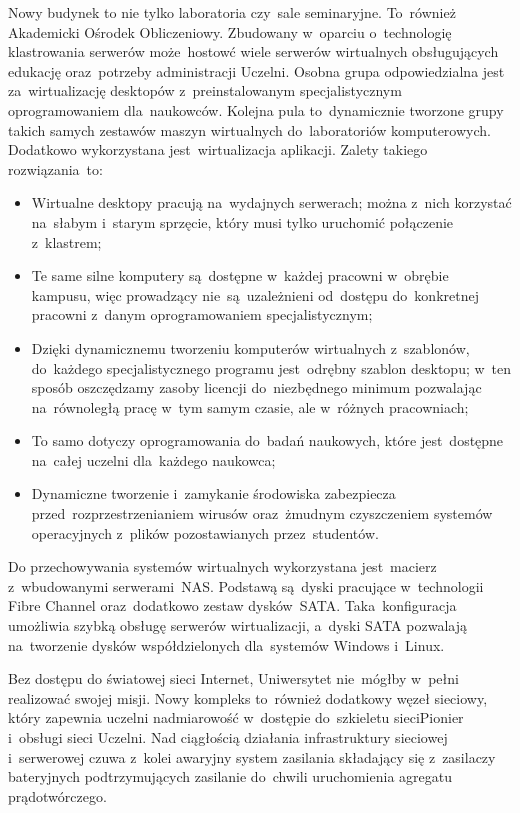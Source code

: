 ﻿\documentclass[a4paper,12pt]{article}
\begin{document}
Nowy budynek to nie tylko laboratoria czy~sale seminaryjne. To~również Akademicki Ośrodek Obliczeniowy. Zbudowany w~oparciu o~technologię klastrowania serwerów może~hostowć wiele serwerów wirtualnych obsługujących edukację oraz~potrzeby administracji Uczelni. Osobna grupa odpowiedzialna jest za~wirtualizację desktopów z~preinstalowanym specjalistycznym oprogramowaniem dla~naukowców. Kolejna pula
to~dynamicznie tworzone grupy takich samych zestawów maszyn wirtualnych do~laboratoriów komputerowych. Dodatkowo wykorzystana jest~wirtualizacja aplikacji. Zalety takiego rozwiązania~to:
\begin{itemize}
	\item Wirtualne desktopy pracują na~wydajnych serwerach; można z~nich korzystać na~słabym i~starym sprzęcie, który musi tylko uruchomić połączenie z~klastrem;
	\item Te same silne komputery są~dostępne w~każdej pracowni w~obrębie kampusu, więc prowadzący nie~są~uzależnieni od~dostępu do~konkretnej pracowni z~danym oprogramowaniem specjalistycznym;
	\item Dzięki dynamicznemu tworzeniu komputerów wirtualnych z~szablonów, do~każdego specjalistycznego programu jest~odrębny szablon desktopu; w~ten sposób oszczędzamy zasoby licencji do~niezbędnego minimum pozwalając na~równoległą pracę w~tym samym czasie, ale w~różnych pracowniach;
	\item To samo dotyczy oprogramowania do~badań naukowych, które jest~dostępne na~całej uczelni dla~każdego naukowca;
	\item Dynamiczne tworzenie i~zamykanie środowiska zabezpiecza przed~rozprzestrzenianiem wirusów oraz~żmudnym czyszczeniem systemów operacyjnych z~plików pozostawianych przez~studentów.
\end{itemize}

Do przechowywania systemów wirtualnych wykorzystana jest~macierz z~wbudowanymi serwerami~NAS. Podstawą są~dyski pracujące w~technologii Fibre Channel oraz~dodatkowo zestaw dysków~SATA. Taka~konfiguracja umożliwia szybką obsługę serwerów wirtualizacji, a~dyski SATA pozwalają na~tworzenie dysków współdzielonych dla~systemów Windows i~Linux.

Bez dostępu do światowej sieci Internet, Uniwersytet nie~mógłby w~pełni realizować swojej misji. Nowy kompleks to~również dodatkowy węzeł sieciowy, który zapewnia uczelni nadmiarowość w~dostępie do~szkieletu sieci\linebreak Pionier i~obsługi sieci Uczelni. Nad ciągłością działania infrastruktury sieciowej i~serwerowej czuwa z~kolei awaryjny system zasilania składający się z~zasilaczy bateryjnych podtrzymujących zasilanie do~chwili uruchomienia agregatu prądotwórczego.
\end{document}
